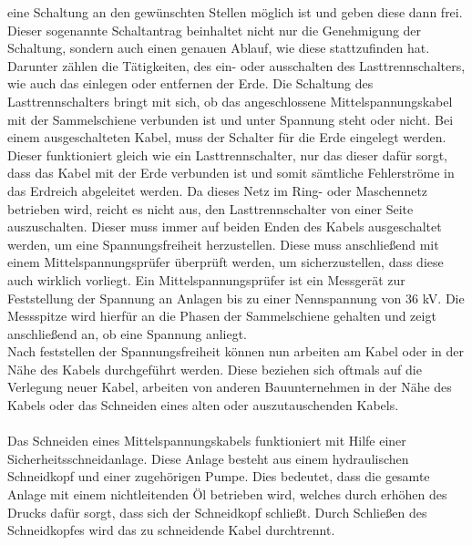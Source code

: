 eine Schaltung an den gewünschten Stellen möglich ist und geben diese dann frei. Dieser sogenannte Schaltantrag beinhaltet nicht nur die Genehmigung der 
Schaltung, sondern auch einen genauen Ablauf, wie diese stattzufinden hat. Darunter zählen die Tätigkeiten, des ein- oder ausschalten des Lasttrennschalters, 
wie auch das einlegen oder entfernen der Erde. Die Schaltung des Lasttrennschalters bringt mit sich, ob das angeschlossene Mittelspannungskabel mit der 
Sammelschiene verbunden ist und unter Spannung steht oder nicht. Bei einem ausgeschalteten Kabel, muss der Schalter für die Erde eingelegt werden. Dieser 
funktioniert gleich wie ein Lasttrennschalter, nur das dieser dafür sorgt, dass das Kabel mit der Erde verbunden ist und somit sämtliche Fehlerströme in das 
Erdreich abgeleitet werden. Da dieses Netz im Ring- oder Maschennetz betrieben wird, reicht es nicht aus, den Lasttrennschalter von einer Seite auszuschalten. 
Dieser muss immer auf beiden Enden des Kabels ausgeschaltet werden, um eine Spannungsfreiheit herzustellen. Diese muss anschließend mit einem 
Mittelspannungsprüfer überprüft werden, um sicherzustellen, dass diese auch wirklich vorliegt. Ein Mittelspannungsprüfer ist ein Messgerät zur 
Feststellung der Spannung an Anlagen bis zu einer Nennspannung von 36 kV. Die Messspitze wird hierfür an die Phasen der Sammelschiene gehalten und 
zeigt anschließend an, ob eine Spannung anliegt. \autocite{Pfisterer.}
\\
Nach feststellen der Spannungsfreiheit können nun arbeiten am Kabel oder in der Nähe des Kabels durchgeführt werden. Diese beziehen sich oftmals auf die 
Verlegung neuer Kabel, arbeiten von anderen Bauunternehmen in der Nähe des Kabels oder das Schneiden eines alten oder auszutauschenden Kabels.
\\\\
Das Schneiden eines Mittelspannungskabels funktioniert mit Hilfe einer Sicherheitsschneidanlage. Diese Anlage besteht aus einem hydraulischen Schneidkopf 
und einer zugehörigen Pumpe. Dies bedeutet, dass die gesamte Anlage mit einem nichtleitenden Öl betrieben wird, welches durch erhöhen des Drucks dafür sorgt, 
dass sich der Schneidkopf schließt. Durch Schließen des Schneidkopfes wird das zu schneidende Kabel durchtrennt.
